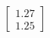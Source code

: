 \documentclass[preview]{standalone}
\begin{document}
\begin{align*}
\begin{bmatrix} 1.27 \\ 1.25 \end{bmatrix}
\end{align*}
\end{document}
